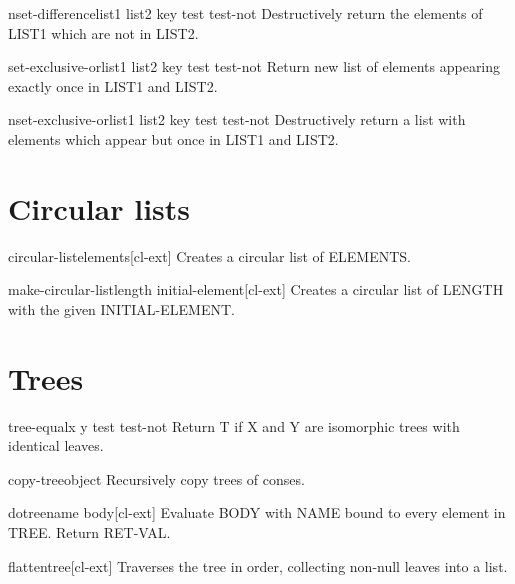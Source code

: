 \documentclass[10pt,english]{book}
\begin{document}
\begin{function}{nset-difference}{list1 list2 \key key test test-not}
  Destructively return the elements of LIST1 which are not in LIST2.
\end{function}

\begin{function}{set-exclusive-or}{list1 list2 \key key test test-not}
  Return new list of elements appearing exactly once in LIST1 and LIST2.
\end{function}

\begin{function}{nset-exclusive-or}{list1 list2 \key key test test-not}
  Destructively return a list with elements which appear but once in LIST1
   and LIST2.
\end{function}

\section{Circular lists}
\label{sec:circular-lists}

\begin{function}{circular-list}{\rest elements}[cl-ext]
  Creates a circular list of ELEMENTS.
\end{function}

\begin{function}{make-circular-list}{length \key initial-element}[cl-ext]
  Creates a circular list of LENGTH with the given INITIAL-ELEMENT.
\end{function}

\section{Trees}
\label{sec:trees}

\begin{function}{tree-equal}{x y \key test test-not}
  Return T if X and Y are isomorphic trees with identical leaves.
\end{function}

\begin{function}{copy-tree}{object}
  Recursively copy trees of conses.
\end{function}

\begin{macro}{dotree}{name \body body}[cl-ext]
  Evaluate BODY with NAME bound to every element in TREE. Return RET-VAL.
\end{macro}

\begin{function}{flatten}{tree}[cl-ext]
  Traverses the tree in order, collecting non-null leaves into a list.
\end{function}
\end{document}
